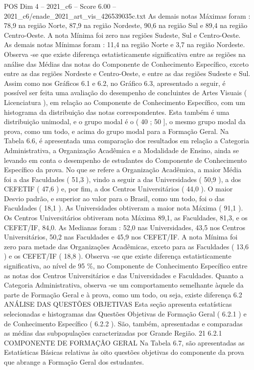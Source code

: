 \begin{textsample}{POS Dim 4 – 2021\_c6 – Score 6.00 – 2021\_c6/enade\_2021\_art\_vis\_426539035c.txt}
As demais notas Máximas foram : 78,9 na região Norte, 87,9 na região Nordeste, 90,6 na região Sul e 89,4 na região Centro-Oeste.
A nota Mínima foi zero nas regiões Sudeste, Sul e Centro-Oeste.
As demais notas Mínimas foram : 11,4 na região Norte e 3,7 na região Nordeste.
Observa -se que existe diferença estatisticamente significativa entre as regiões na análise das Médias das notas do Componente de Conhecimento Específico, exceto entre as das regiões Nordeste e Centro-Oeste, e entre as das regiões Sudeste e Sul.
Assim como nos Gráficos 6.1 e 6.2, no Gráfico 6.3, apresentado a seguir, é possível ser feita uma avaliação do desempenho de concluintes de Artes Visuais ( Licenciatura ), em relação ao Componente de Conhecimento Específico, com um histograma da distribuição das notas correspondentes.
Esta também é uma distribuição unimodal, e o grupo modal é o ( 40 ; 50 ], o mesmo grupo modal da prova, como um todo, e acima do grupo modal para a Formação Geral.
Na Tabela 6.6, é apresentada uma comparação dos resultados em relação a Categoria Administrativa, a Organização Acadêmica e a Modalidade de Ensino, ainda se levando em conta o desempenho de estudantes do Componente de Conhecimento Específico da prova.
No que se refere a Organização Acadêmica, a maior Média foi a das Faculdades ( 51,3 ), vindo a seguir a das Universidades ( 50,9 ), a dos CEFETIF ( 47,6 ) e, por fim, a dos Centros Universitários ( 44,0 ).
O maior Desvio padrão, e superior ao valor para o Brasil, como um todo, foi o das Faculdades ( 18,1 ).
As Universidades obtiveram a maior nota Máxima ( 91,1 ).
Os Centros Universitários obtiveram nota Máxima 89,1, as Faculdades, 81,3, e os CEFET/IF, 84,0.
As Medianas foram : 52,0 nas Universidades, 43,5 nos Centros Universitários, 50,2 nas Faculdades e 45,9 nos CEFET/IF.
A nota Mínima foi zero para metade das Organizações Acadêmicas, exceto para as Faculdades ( 13,6 ) e os CEFET/IF ( 18,8 ).
Observa -se que existe diferença estatisticamente significativa, ao nível de 95 \%, no Componente de Conhecimento Específico entre as notas dos Centros Universitários e das Universidades e Faculdades.
Quanto a Categoria Administrativa, observa -se um comportamento semelhante àquele da parte de Formação Geral e à prova, como um todo, ou seja, existe diferença 6.2 ANÁLISE DAS QUESTÕES OBJETIVAS Esta seção apresenta estatísticas selecionadas e histogramas das Questões Objetivas de Formação Geral ( 6.2.1 ) e de Conhecimento Específico ( 6.2.2 ).
São, também, apresentadas e comparadas as médias das subpopulações caracterizadas por Grande Região. 21 6.2.1 COMPONENTE DE FORMAÇÃO GERAL Na Tabela 6.7, são apresentadas as Estatísticas Básicas relativas às oito questões objetivas do componente da prova que abrange a Formação Geral dos estudantes.

\end{textsample}
